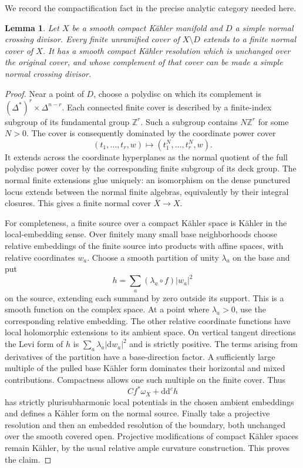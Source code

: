 \documentclass[11pt,letterpaper]{article}
\newcommand{\Z}{\mathbb{Z}}
\newcommand{\dd}{\mathrm{d}}
\newcommand{\ddc}{\mathrm{d}\mathrm{d}^{c}}
\newtheorem{lemma}[theorem]{Lemma}
\theoremstyle{definition}
\theoremstyle{remark}
\begin{document}
We record the compactification fact in the precise analytic category
needed here.

\begin{lemma}\label{fol:cover-compactification}
Let $X$ be a smooth compact K\"ahler manifold and $D$ a simple normal
crossing divisor.  Every finite unramified cover of $X\setminus D$
extends to a finite normal cover of $X$.  It has a smooth compact
K\"ahler resolution which is unchanged over the original cover, and
whose complement of that cover can be made a simple normal crossing
divisor.
\end{lemma}

\begin{proof}
Near a point of $D$, choose a polydisc on which its complement is
$(\Delta^*)^r\times\Delta^{n-r}$.  Each connected finite cover is
described by a finite-index subgroup of its fundamental group
$\Z^r$.  Such a subgroup contains $N\Z^r$ for some $N>0$.
The cover is consequently dominated by the coordinate power cover
\[
 (t_1,\ldots,t_r,w)\longmapsto(t_1^N,\ldots,t_r^N,w).
\]
It extends across the coordinate hyperplanes as the normal quotient
of the full polydisc power cover by the corresponding finite subgroup
of its deck group.  The normal finite extensions glue uniquely:
an isomorphism on the dense punctured locus extends between the
normal finite algebras, equivalently by their integral closures.
This gives a finite normal cover $\overline X\to X$.

For completeness, a finite source over a compact K\"ahler space is
K\"ahler in the local-embedding sense.  Over finitely many small base
neighborhoods choose relative embeddings of the finite source into
products with affine spaces, with relative coordinates $w_a$.
Choose a smooth partition of unity $\lambda_a$ on the base and put
\[
 h=\sum_a(\lambda_a\circ f)|w_a|^2
\]
on the source, extending each summand by zero outside its support.
This is a smooth function on the complex space.  At a point where
$\lambda_a>0$, use the corresponding relative embedding.
The other relative coordinate functions have local holomorphic
extensions to its ambient space.  On vertical tangent directions the
Levi form of $h$ is
$\sum_a\lambda_a|\dd w_a|^2$ and is strictly positive.  The terms
arising from derivatives of the partition have a base-direction
factor.  A sufficiently large multiple of the pulled base K\"ahler
form dominates their horizontal and mixed contributions.  Compactness
allows one such multiple on the finite cover.  Thus
\[
 C f^*\omega_X+\ddc h
\]
has strictly plurisubharmonic local potentials in the chosen ambient
embeddings and defines a K\"ahler form on the normal source.
Finally take a projective resolution and then an embedded resolution
of the boundary, both unchanged over the smooth covered open.
Projective modifications of compact K\"ahler spaces remain K\"ahler,
by the usual relative ample curvature construction.  This proves the
claim.
\end{proof}
\end{document}
